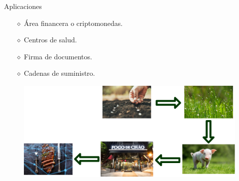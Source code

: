 \documentclass[10pt,aspectratio=169,]{beamer}
\begin{document}
\begin{frame}[c]{Aplicaciones}
	\Large
	\begin{itemize}
		\item[$\diamond$] Área financera o criptomonedas.
		\item[$\diamond$] Centros de salud.
		\item[$\diamond$] Firma de documentos.
		\item[$\diamond$] Cadenas de suministro.
	\end{itemize}
	\vspace*{-2cm}
	\begin{figure}
		\begin{flushright}
			\includegraphics[height=4.9cm]{FogodeChao.png}
		\end{flushright}
	\end{figure}
\end{frame}

\end{document}
